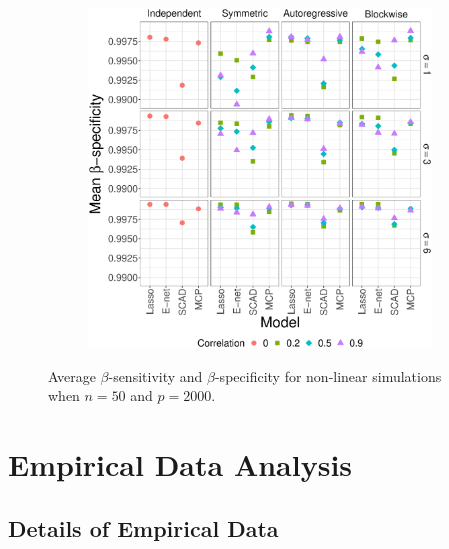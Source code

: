 \documentclass[final,onefignum,onetabnum]{siuro210301}
\begin{document}
\begin{figure}[!htb]
\begin{subfigure}[b]{0.47\textwidth}
			\includegraphics[width=\textwidth]{images/facet/publication_facet_specificity_nonlinear_50_2000.eps}
			\label{fig:nonlinear-specificity}
		\end{subfigure}
		\captionsetup{width=0.8\textwidth}
		\caption{Average $\beta$-sensitivity and $\beta$-specificity for non-linear simulations when $n = 50$ and $p = 2000$.}
		\label{fig:nonlinear-beta}
	\end{figure}
	
	\section{Empirical Data Analysis}\label{sec:empirical}
	\subsection{Details of Empirical Data}
	
\end{document}
